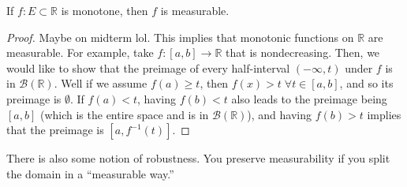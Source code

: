   \begin{theorem} 
    If $f: E \subset \mathbb{R}$ is monotone, then $f$ is measurable.
  \end{theorem}
  \begin{proof}
    Maybe on midterm lol. This implies that monotonic functions on $\mathbb{R}$ are measurable. For example, take $f: [a, b] \longrightarrow \mathbb{R}$ that is nondecreasing. Then, we would like to show that the preimage of every half-interval $(-\infty, t)$ under $f$ is in $\mathcal{B}(\mathbb{R})$. Well if we assume $f(a) \geq t$, then $f(x) > t \; \forall t \in [a, b]$, and so its preimage is $\emptyset$. If $f(a) < t$, having $f(b) < t$ also leads to the preimage being $[a, b]$ (which is the entire space and is in $\mathcal{B}(\mathbb{R})$), and having $f(b) > t$ implies that the preimage is $[a, f^{-1}(t)]$. 
  \end{proof}

  There is also some notion of robustness. You preserve measurability if you split the domain in a ``measurable way.'' 

